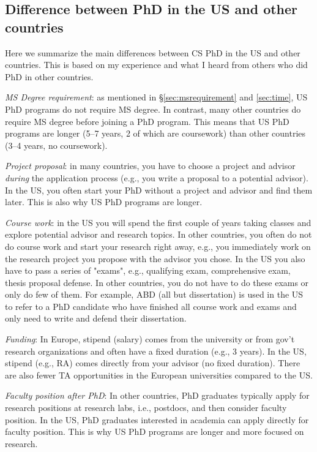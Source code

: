 \documentclass[11pt]{article}
\begin{document}
\subsection{Difference between PhD in the US and other countries}
Here we summarize the main differences between CS PhD in the US and other countries.  This is based on my experience and what I heard from others who did PhD in other countries. 

\emph{MS Degree requirement}:  as mentioned in \S\ref{sec:msrequirement} and \ref{sec:time}, US PhD programs do not require MS degree.  In contrast, many other countries do require MS degree before joining a PhD program.  This means that US PhD programs are longer (5--7 years, 2 of which are coursework) than other countries (3--4 years, no coursework).  

\emph{Project proposal}: in many countries, you have to choose a project and advisor \emph{during} the application process (e.g., you write a proposal to a potential advisor). In the US, you often start your PhD without a project and advisor and find them later. This is also why US PhD programs are longer.

\emph{Course work}: in the US you will spend the first couple of years taking classes and explore potential advisor and research topics. In other countries, you often do not do course work and start your research right away, e.g., you immediately work on the research project you propose with the advisor you chose. In the US you also have to pass a series of "exams", e.g., qualifying exam, comprehensive exam, thesis proposal defense.  In other countries, you do not have to do these exams or only do few of them. For example, ABD (all but dissertation) is used in the US to refer to a PhD candidate who have finished all course work and exams and only need to write and defend their dissertation.

\emph{Funding}:  In Europe, stipend (salary) comes from the university or from gov't research organizations and often have a fixed duration (e.g., 3 years).  In the US, stipend (e.g., RA) comes directly from your advisor (no fixed duration).  There are also fewer TA opportunities in the European universities compared to the US.

\emph{Faculty position after PhD}: In other countries, PhD graduates typically apply for research positions at research labs, i.e., postdocs, and then consider faculty position. In the US, PhD graduates interested in academia can apply directly for faculty position.  This is why US PhD programs are longer and more focused on research.
\end{document}
